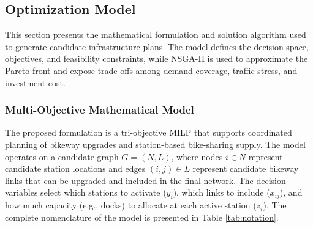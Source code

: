\documentclass[preprint,authoryear,10pt]{elsarticle}
\begin{document}
\subsection{Optimization Model}\label{subsec:optimization_model}

This section presents the mathematical formulation and solution algorithm used to generate candidate infrastructure plans. The model defines the decision space, objectives, and feasibility constraints, while NSGA-II is used to approximate the Pareto front and expose trade-offs among demand coverage, traffic stress, and investment cost.

\subsubsection{Multi-Objective Mathematical Model}\label{subsubsec:math_model}

The proposed formulation is a tri-objective MILP that supports coordinated planning of bikeway upgrades and station-based bike-sharing supply. The model operates on a candidate graph $G=(N,L)$, where nodes $i\in N$ represent candidate station locations and edges $(i,j)\in L$ represent candidate bikeway links that can be upgraded and included in the final network. The decision variables select which stations to activate ($y_i$), which links to include ($x_{ij}$), and how much capacity (e.g., docks) to allocate at each active station ($z_i$). The complete nomenclature of the model is presented in Table \ref{tab:notation}.
\end{document}
